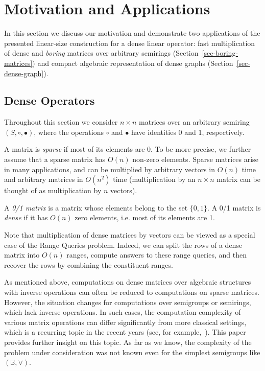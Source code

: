 \documentclass[11pt,letterpaper]{article}
\begin{document}
\section{Motivation and Applications}\label{sec-applications}

In this section we discuss our motivation and demonstrate two applications of
the presented linear-size construction for a dense linear operator: fast
multiplication of dense and \emph{boring} matrices over arbitrary semirings
(Section~\ref{sec-boring-matrices}) and compact algebraic representation of
dense graphs (Section~\ref{sec-dense-graph}).

\subsection{Dense Operators}

Throughout this section we consider $n \times n$ matrices over an arbitrary
semiring $(S, \circ, \bullet)$, where the operations $\circ$ and $\bullet$ have
identities 0 and 1, respectively.

A matrix is \emph{sparse} if most of its elements are 0. To be more precise, we
further assume that a sparse matrix has $O(n)$ non-zero elements. Sparse
matrices arise in many applications, and can be multiplied by arbitrary vectors
in $O(n)$ time and arbitrary matrices in $O(n^2)$ time (multiplication
by an $n\times n$ matrix can be thought of as multiplication by $n$ vectors).

A \emph{0/1 matrix} is a matrix whose elements belong to the set $\{0,1\}$. A
0/1 matrix is \emph{dense} if it has $O(n)$ zero elements, i.e. most of its
elements are 1.

Note that multiplication of dense matrices by vectors can be viewed as a special
case of the Range Queries problem. Indeed, we can split the rows of a dense
matrix into $O(n)$ ranges, compute answers to these range queries, and then
recover the rows by combining the constituent ranges.

As mentioned above, computations on dense matrices over algebraic structures
with inverse operations can often be reduced to computations on sparse matrices.
However, the situation changes for computations over semigroups or semirings,
which lack inverse operations. In such cases, the computation complexity of
various matrix operations can differ significantly from more classical settings,
which is a recurring topic in the recent years (see, for
example,~\cite{AkianGG12,Williams14,GrigorievP15}). This paper provides further
insight on this topic. As far as we know, the complexity of the problem under
consideration was not known even for the simplest semigroups like
$(\mathbb{B},\vee)$.
\end{document}
